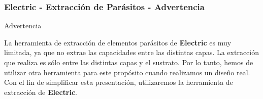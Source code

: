 \documentclass{beamer}
\begin{document}
\begin{frame}
\frametitle{Electric - Extracción de Parásitos - Advertencia}
\begin{Huge}\centerline{Advertencia}
\end{Huge}

La herramienta de extracción de elementos parásitos de \textbf{Electric} es muy limitada, ya que no extrae las capacidades entre las distintas capas. La extracción que realiza es sólo entre las distintas capas y el sustrato. Por lo tanto, hemos de utilizar otra herramienta para este propósito cuando realizamos un diseño real. Con el fin de simplificar esta presentación, utilizaremos la herramienta de extracción de \textbf{Electric}.  
\end{frame}
\end{document}
